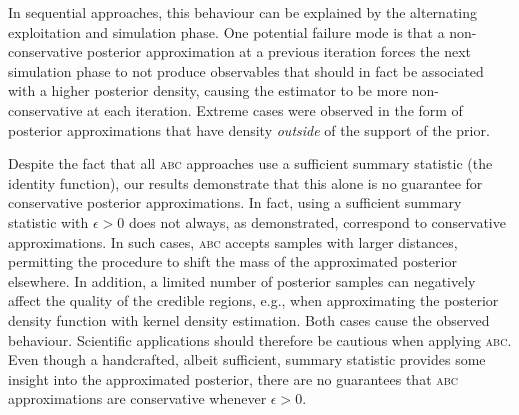\documentclass[twoside]{article}
\begin{document}
In sequential approaches, this behaviour can be explained by the alternating exploitation and simulation phase. One potential failure mode
is that a non-conservative posterior approximation at a previous iteration forces the next simulation phase to not produce observables
that should in fact be associated with a higher posterior density, causing the estimator to be more non-conservative at each iteration.
Extreme cases were observed in the form of posterior approximations that have density \emph{outside} of the support of the prior.

Despite the fact that all \textsc{abc} approaches use a sufficient summary statistic (the identity function), our results demonstrate that this alone is no guarantee for conservative posterior approximations. In fact,
using a sufficient summary statistic with $\epsilon > 0$ does not always, as demonstrated, correspond to conservative approximations.
In such cases, \textsc{abc} accepts
samples with larger distances, permitting the procedure to shift the mass of the approximated posterior elsewhere. In addition, a limited number of posterior samples can negatively affect the quality of the credible regions, e.g., when approximating the posterior density function with kernel density estimation.
Both cases cause the observed behaviour. Scientific applications should therefore be cautious when applying \textsc{abc}. Even though a handcrafted, albeit sufficient, summary statistic provides some insight into the approximated posterior, there are no guarantees that \textsc{abc} approximations are conservative whenever $\epsilon > 0$.
\end{document}
